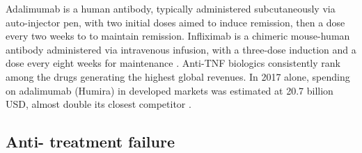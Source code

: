 Adalimumab is a human antibody, typically administered subcutaneously via auto-injector pen, with two initial doses aimed to induce remission, then a dose every two weeks to to maintain remission. 
Infliximab is a chimeric mouse-human antibody administered via intravenous infusion, with a three-dose induction and a dose every eight weeks for maintenance \autocite{adegbola2018AntiTNFTherapyCrohn}.
Anti-\gls{TNF} biologics consistently rank among the drugs generating the highest global revenues.
In 2017 alone, spending on adalimumab (Humira) in developed markets was estimated at 20.7 billion USD, almost double its closest competitor \autocite{aitken2019GlobalUseMedicine}.


\subsection{Anti- treatment failure}

